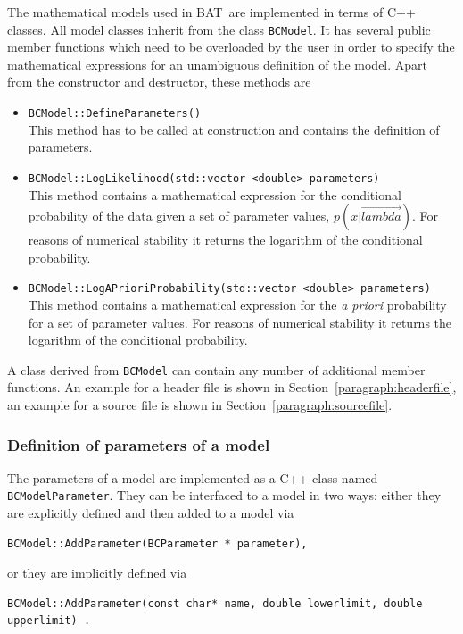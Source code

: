 \documentclass[11pt, a4paper]{article}
\newcommand{\BAT}{{\sc BAT}}
\begin{document}
The mathematical models used in \BAT\ are implemented in terms of C++
classes. All model classes inherit from the class \verb|BCModel|. It
has several public member functions which need to be overloaded by the
user in order to specify the mathematical expressions for an
unambiguous definition of the model. Apart from the constructor and
destructor, these methods are
% 
\begin{itemize}
\item \verb|BCModel::DefineParameters()| \\
This method has to be called at construction and contains the
definition of parameters.
% 
\item \verb|BCModel::LogLikelihood(std::vector <double> parameters)| \\ 
This method contains a mathematical expression for the conditional
probability of the data given a set of parameter values,
$p(x|\vec{lambda})$. For reasons of numerical stability it returns the
logarithm of the conditional probability.
%
\item \verb|BCModel::LogAPrioriProbability(std::vector <double> parameters)| \\
This method contains a mathematical expression for the {\it a priori}
probability for a set of parameter values. For reasons of numerical
stability it returns the logarithm of the conditional probability.
\end{itemize} 

\noindent 
A class derived from \verb|BCModel| can contain any number of additional 
member functions. An example for a header file is shown in 
Section~\ref{paragraph:headerfile}, an example for a source file is shown 
in Section~\ref{paragraph:sourcefile}. 


\subsubsection{Definition of parameters of a model} 
\label{subsubsection:parameters}

The parameters of a model are implemented as a C++ class named
\verb|BCModelParameter|. They can be interfaced to a model in two
ways: either they are explicitly defined and then added to a model via
%
\begin{verbatim}
BCModel::AddParameter(BCParameter * parameter),
\end{verbatim}

\noindent 
or they are implicitly defined via 
%
\begin{verbatim}
BCModel::AddParameter(const char* name, double lowerlimit, double upperlimit) . 
\end{verbatim}
\end{document}
